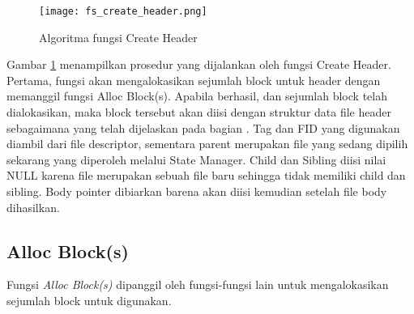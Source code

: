 \documentclass[a4paper, 12pt]{report}
\begin{document}

\begin{figure}
\centering
\texttt{[image: fs\_create\_header.png]}
\caption{Algoritma fungsi Create Header}
\label{fig-create-header}
\end{figure}

Gambar \ref{fig-create-header} menampilkan prosedur yang dijalankan oleh fungsi Create Header. Pertama, fungsi akan mengalokasikan sejumlah block untuk header dengan memanggil fungsi Alloc Block(s). Apabila berhasil, dan sejumlah block telah dialokasikan, maka block tersebut akan diisi dengan struktur data file header sebagaimana yang telah dijelaskan pada bagian . Tag dan FID yang digunakan diambil dari file descriptor, sementara parent merupakan file yang sedang dipilih sekarang yang diperoleh melalui State Manager. Child dan Sibling diisi nilai NULL karena file merupakan sebuah file baru sehingga tidak memiliki child dan sibling. Body pointer dibiarkan barena akan diisi kemudian setelah file body dihasilkan.



\subsection{Alloc Block(s)}

Fungsi {\em Alloc Block(s)} dipanggil oleh fungsi-fungsi lain untuk mengalokasikan sejumlah block untuk digunakan. 
\end{document}

